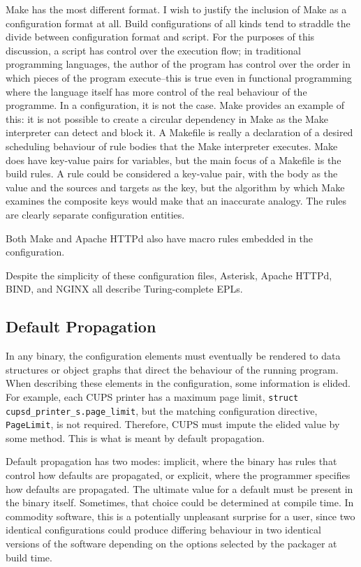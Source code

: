 \documentclass[letterpaper,twocolumn,10pt]{article}
\begin{document}
Make has the most different format. I wish to justify the inclusion of Make as a configuration format at all. Build configurations of all kinds tend to straddle the divide between configuration format and script. For the purposes of this discussion, a script has control over the execution flow; in traditional programming languages, the author of the program has control over the order in which pieces of the program execute--this is true even in functional programming where the language itself has more control of the real behaviour of the programme. In a configuration, it is not the case. Make provides an example of this: it is not possible to create a circular dependency in Make as the Make interpreter can detect and block it. A Makefile is really a declaration of a desired scheduling behaviour of rule bodies that the Make interpreter executes. Make does have key-value pairs for variables, but the main focus of a Makefile is the build rules. A rule could be considered a key-value pair, with the body as the value and the sources and targets as the key, but the algorithm by which Make examines the composite keys would make that an inaccurate analogy. The rules are clearly separate configuration entities.

Both Make and Apache HTTPd also have macro rules embedded in the configuration.

Despite the simplicity of these configuration files, Asterisk, Apache HTTPd, BIND, and NGINX all describe Turing-complete EPLs.

\subsection{Default Propagation}
In any binary, the configuration elements must eventually be rendered to data structures or object graphs that direct the behaviour of the running program. When describing these elements in the configuration, some information is elided. For example, each CUPS printer has a maximum page limit, \verb!struct cupsd_printer_s.page_limit!, but the matching configuration directive, \verb!PageLimit!, is not required. Therefore, CUPS must impute the elided value by some method. This is what is meant by default propagation.

Default propagation has two modes: implicit, where the binary has rules that control how defaults are propagated, or explicit, where the programmer specifies how defaults are propagated. The ultimate value for a default must be present in the binary itself. Sometimes, that choice could be determined at compile time. In commodity software, this is a potentially unpleasant surprise for a user, since two identical configurations could produce differing behaviour in two identical versions of the software depending on the options selected by the packager at build time.
\end{document}
